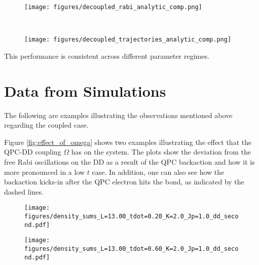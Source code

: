 \documentclass{article}
\begin{document}
\begin{figure*}[t!]
    \centering
    \begin{subfigure}[t]{0.5\textwidth}
        \centering
        \texttt{[image: figures/decoupled\_rabi\_analytic\_comp.png]}
        \caption{}
    \end{subfigure}%
    \\
    \begin{subfigure}[t]{0.9\textwidth}
        \centering
        \texttt{[image: figures/decoupled\_trajectories\_analytic\_comp.png]}
        \caption{}
    \end{subfigure}\caption{Comparison between the numerical results and the exact solution for the decoupled case. (a) Rabi oscillations in the double dot, the solid line is exact. (b) Trajectories of the QPC wave-packet. The Analytical result shows the wavefunction and the numerical one the local densities $n(x,t)$.}\label{fig:benchmark}
\end{figure*}

This performance is consistent across different parameter regimes. 

\section{Data from Simulations}\label{sec:results}

The following are examples illustrating the observations mentioned above regarding the coupled case. 

Figure \ref{fig:effect_of_omega} shows two examples illustrating the effect that the QPC-DD coupling $\Omega$ has on the system. The plots show the deviation from the free Rabi oscillations on the DD as a result of the QPC backaction and how it is more pronounced in a low $t$ case. In addition, one can also see how the backaction kicks-in after the QPC electron hits the bond, as indicated by the dashed lines. 

\begin{figure*}[t!]
    \centering
    \begin{subfigure}[t]{0.5\textwidth}
        \centering
        \texttt{[image: figures/density\_sums\_L=13.00\_tdot=0.20\_K=2.0\_Jp=1.0\_dd\_second.pdf]}
        \caption{}
    \end{subfigure}%
    \begin{subfigure}[t]{0.5\textwidth}
        \centering
        \texttt{[image: figures/density\_sums\_L=13.00\_tdot=0.60\_K=2.0\_Jp=1.0\_dd\_second.pdf]}
        \caption{}
\end{subfigure}\caption{Effect of the QPC-DD coupling $\Omega$ for two different values of the DD hopping $t$ in the semiclassical regime with $k_0=\Delta x =2.0$. Both cases have bond hopping $J_p =1$. The upper plot shows the oscillations in the double dot, while the ones at the bottom show the sums of the densities to the left and rifht of the bond (solid lines), at the bond (dashed line) and at the las QPC site (dotted line).}\label{fig:effect_of_omega}
\end{figure*}
\end{document}
